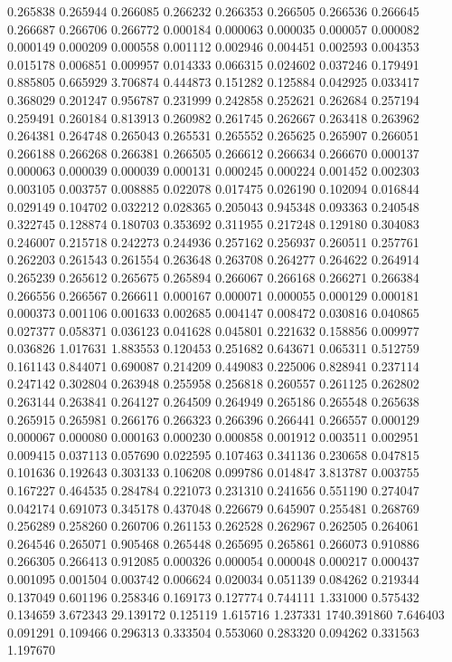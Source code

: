 0.265838
0.265944
0.266085
0.266232
0.266353
0.266505
0.266536
0.266645
0.266687
0.266706
0.266772
0.000184
0.000063
0.000035
0.000057
0.000082
0.000149
0.000209
0.000558
0.001112
0.002946
0.004451
0.002593
0.004353
0.015178
0.006851
0.009957
0.014333
0.066315
0.024602
0.037246
0.179491
0.885805
0.665929
3.706874
0.444873
0.151282
0.125884
0.042925
0.033417
0.368029
0.201247
0.956787
0.231999
0.242858
0.252621
0.262684
0.257194
0.259491
0.260184
0.813913
0.260982
0.261745
0.262667
0.263418
0.263962
0.264381
0.264748
0.265043
0.265531
0.265552
0.265625
0.265907
0.266051
0.266188
0.266268
0.266381
0.266505
0.266612
0.266634
0.266670
0.000137
0.000063
0.000039
0.000039
0.000131
0.000245
0.000224
0.001452
0.002303
0.003105
0.003757
0.008885
0.022078
0.017475
0.026190
0.102094
0.016844
0.029149
0.104702
0.032212
0.028365
0.205043
0.945348
0.093363
0.240548
0.322745
0.128874
0.180703
0.353692
0.311955
0.217248
0.129180
0.304083
0.246007
0.215718
0.242273
0.244936
0.257162
0.256937
0.260511
0.257761
0.262203
0.261543
0.261554
0.263648
0.263708
0.264277
0.264622
0.264914
0.265239
0.265612
0.265675
0.265894
0.266067
0.266168
0.266271
0.266384
0.266556
0.266567
0.266611
0.000167
0.000071
0.000055
0.000129
0.000181
0.000373
0.001106
0.001633
0.002685
0.004147
0.008472
0.030816
0.040865
0.027377
0.058371
0.036123
0.041628
0.045801
0.221632
0.158856
0.009977
0.036826
1.017631
1.883553
0.120453
0.251682
0.643671
0.065311
0.512759
0.161143
0.844071
0.690087
0.214209
0.449083
0.225006
0.828941
0.237114
0.247142
0.302804
0.263948
0.255958
0.256818
0.260557
0.261125
0.262802
0.263144
0.263841
0.264127
0.264509
0.264949
0.265186
0.265548
0.265638
0.265915
0.265981
0.266176
0.266323
0.266396
0.266441
0.266557
0.000129
0.000067
0.000080
0.000163
0.000230
0.000858
0.001912
0.003511
0.002951
0.009415
0.037113
0.057690
0.022595
0.107463
0.341136
0.230658
0.047815
0.101636
0.192643
0.303133
0.106208
0.099786
0.014847
3.813787
0.003755
0.167227
0.464535
0.284784
0.221073
0.231310
0.241656
0.551190
0.274047
0.042174
0.691073
0.345178
0.437048
0.226679
0.645907
0.255481
0.268769
0.256289
0.258260
0.260706
0.261153
0.262528
0.262967
0.262505
0.264061
0.264546
0.265071
0.905468
0.265448
0.265695
0.265861
0.266073
0.910886
0.266305
0.266413
0.912085
0.000326
0.000054
0.000048
0.000217
0.000437
0.001095
0.001504
0.003742
0.006624
0.020034
0.051139
0.084262
0.219344
0.137049
0.601196
0.258346
0.169173
0.127774
0.744111
1.331000
0.575432
0.134659
3.672343
29.139172
0.125119
1.615716
1.237331
1740.391860
7.646403
0.091291
0.109466
0.296313
0.333504
0.553060
0.283320
0.094262
0.331563
1.197670
